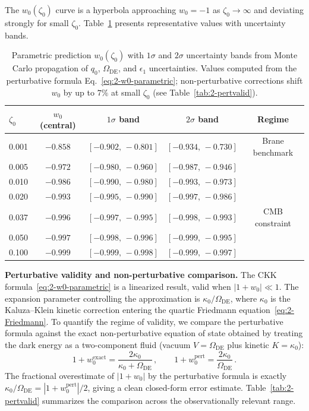 The $w_0(\zeta_0)$ curve is a hyperbola approaching $w_0 = -1$ as $\zeta_0 \to \infty$ and deviating strongly for small $\zeta_0$. Table~\ref{tab:2-w0-curve} presents representative values with uncertainty bands.

\begin{table}[htbp]
\centering
\caption{Parametric prediction $w_0(\zeta_0)$ with $1\sigma$ and $2\sigma$ uncertainty bands from Monte Carlo propagation of $q_0$, $\Omega_\mathrm{DE}$, and $\epsilon_1$ uncertainties. Values computed from the perturbative formula Eq.~\eqref{eq:2-w0-parametric}; non-perturbative corrections shift $w_0$ by up to $7\%$ at small $\zeta_0$ (see Table~\ref{tab:2-pertvalid}).}
\label{tab:2-w0-curve}
\begin{tabular}{lcccc}
\toprule
$\zeta_0$ & $w_0$ (central) & $1\sigma$ band & $2\sigma$ band & Regime \\
\midrule
0.001 & $-0.858$ & $[-0.902,\,-0.801]$ & $[-0.934,\,-0.730]$ & Brane benchmark \\
0.005 & $-0.972$ & $[-0.980,\,-0.960]$ & $[-0.987,\,-0.946]$ & \\
0.010 & $-0.986$ & $[-0.990,\,-0.980]$ & $[-0.993,\,-0.973]$ & \\
0.020 & $-0.993$ & $[-0.995,\,-0.990]$ & $[-0.997,\,-0.986]$ & \\
0.037 & $-0.996$ & $[-0.997,\,-0.995]$ & $[-0.998,\,-0.993]$ & CMB constraint \\
0.050 & $-0.997$ & $[-0.998,\,-0.996]$ & $[-0.999,\,-0.995]$ & \\
0.100 & $-0.999$ & $[-0.999,\,-0.998]$ & $[-0.999,\,-0.997]$ & \\
\bottomrule
\end{tabular}
\end{table}

\textbf{Perturbative validity and non-perturbative comparison.} The CKK formula~\eqref{eq:2-w0-parametric} is a linearized result, valid when $|1 + w_0| \ll 1$. The expansion parameter controlling the approximation is $\kappa_0/\Omega_{\mathrm{DE}}$, where $\kappa_0$ is the Kaluza--Klein kinetic correction entering the quartic Friedmann equation~\eqref{eq:2-Friedmann}. To quantify the regime of validity, we compare the perturbative formula against the exact non-perturbative equation of state obtained by treating the dark energy as a two-component fluid (vacuum $V = \Omega_{\mathrm{DE}}$ plus kinetic $K = \kappa_0$):
\begin{equation}
\label{eq:2-w0-exact}
1 + w_0^{\mathrm{exact}} = \frac{2\kappa_0}{\kappa_0 + \Omega_{\mathrm{DE}}}\,,
\qquad
1 + w_0^{\mathrm{pert}} = \frac{2\kappa_0}{\Omega_{\mathrm{DE}}}\,.
\end{equation}
The fractional overestimate of $|1+w_0|$ by the perturbative formula is exactly $\kappa_0/\Omega_{\mathrm{DE}} = |1 + w_0^{\mathrm{pert}}|/2$, giving a clean closed-form error estimate. Table~\ref{tab:2-pertvalid} summarizes the comparison across the observationally relevant range.

